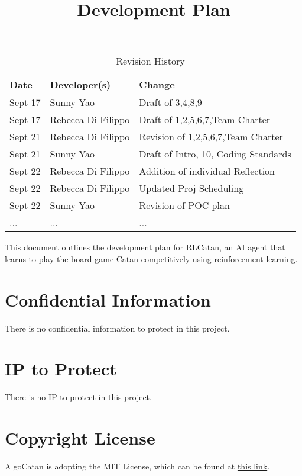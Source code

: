 \documentclass{article}
\title{Development Plan\\\progname}
\author{\authname}
\date{}
\begin{document}
\maketitle

\begin{table}[hp]
\caption{Revision History} \label{TblRevisionHistory}
\begin{tabularx}{\textwidth}{llX}
\toprule
\textbf{Date} & \textbf{Developer(s)} & \textbf{Change}\\
\midrule
Sept 17 & Sunny Yao & Draft of 3,4,8,9\\
Sept 17 & Rebecca Di Filippo & Draft of 1,2,5,6,7,Team Charter\\
Sept 21 & Rebecca Di Filippo & Revision of 1,2,5,6,7,Team Charter\\
Sept 21 & Sunny Yao & Draft of Intro, 10, Coding Standards\\
Sept 22 & Rebecca Di Filippo & Addition of individual Reflection\\
Sept 22 & Rebecca Di Filippo & Updated Proj Scheduling\\
Sept 22 & Sunny Yao & Revision of POC plan\\
... & ... & ...\\
\bottomrule
\end{tabularx}
\end{table}

\newpage{}

\raggedright
This document outlines the development plan for RLCatan, an
AI agent that learns to play the board game Catan competitively 
using reinforcement learning. 

\section{Confidential Information}

\raggedright
There is no confidential information to protect in this project.

\section{IP to Protect}

\raggedright
There is no IP to protect in this project.

\section{Copyright License}

\raggedright{AlgoCatan is adopting the MIT License, which can be found at \href{https://github.com/SY3141/RLCatan/blob/main/LICENSE}{this link}.}
\end{document}
